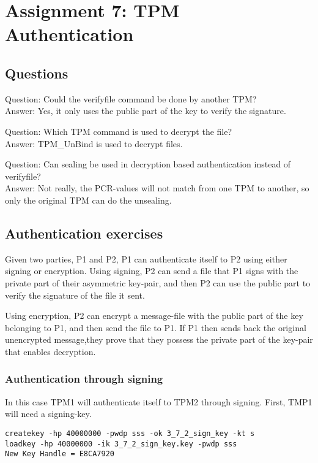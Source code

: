 \documentclass[10pt]{article}
\begin{document}
\section{Assignment 7: TPM Authentication}

  \subsection{Questions}

    Question: Could the verifyfile command be done by another TPM? \\
    Answer: Yes, it only uses the public part of the key to verify the signature.

    Question: Which TPM command is used to decrypt the file? \\
    Answer: TPM\_UnBind is used to decrypt files.

    Question: Can sealing be used in decryption based authentication instead of
    verifyfile? \\
    Answer: Not really, the PCR-values will not match from one TPM to another, so only
    the original TPM can do the unsealing.

  \subsection{Authentication exercises}

    Given two parties, P1 and P2, P1 can authenticate itself to P2 using either
    signing or encryption. Using signing, P2 can send a file that P1 signs with
    the private part of their asymmetric key-pair, and then P2 can use the
    public part to verify the signature of the file it sent.

    Using encryption, P2 can encrypt a message-file with the public part of the
    key belonging to P1, and then send the file to P1. If P1 then sends back
    the original unencrypted message,they prove that they possess the private
    part of the key-pair that enables decryption.

    \subsubsection{Authentication through signing}

      In this case TPM1 will authenticate itself to TPM2 through signing.
      First, TMP1 will need a signing-key.

\begin{verbatim}
createkey -hp 40000000 -pwdp sss -ok 3_7_2_sign_key -kt s
loadkey -hp 40000000 -ik 3_7_2_sign_key.key -pwdp sss
New Key Handle = E8CA7920
\end{verbatim}
\end{document}
